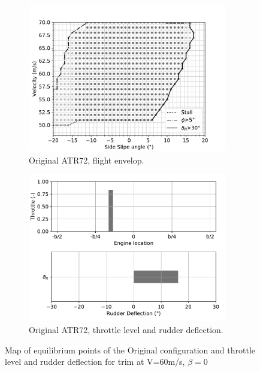 \begin{figure}[hbt]
	\centering
	\begin{subfigure}{0.49\textwidth}
		\includegraphics[width=0.95\textwidth]{originalMapBetaVelfin1Eng3RudFalse}
		\caption{Original ATR72, flight envelop.}
		\label{fig:originalfin1_3engine}
	\end{subfigure}
	\begin{subfigure}{0.49\textwidth}
		\includegraphics[width=0.95\textwidth]{Defloriginalfin1Eng3RudFalse}
		\caption{Original ATR72, throttle level and rudder deflection.}
		\label{fig:Defloriginalfin1_3engine}
	\end{subfigure}
	\caption{Map of equilibrium points of the Original configuration and throttle level and rudder deflection for trim at V=60m/s, $\beta=0$} \label{MapOrignialTwin+DEP}
\end{figure}

